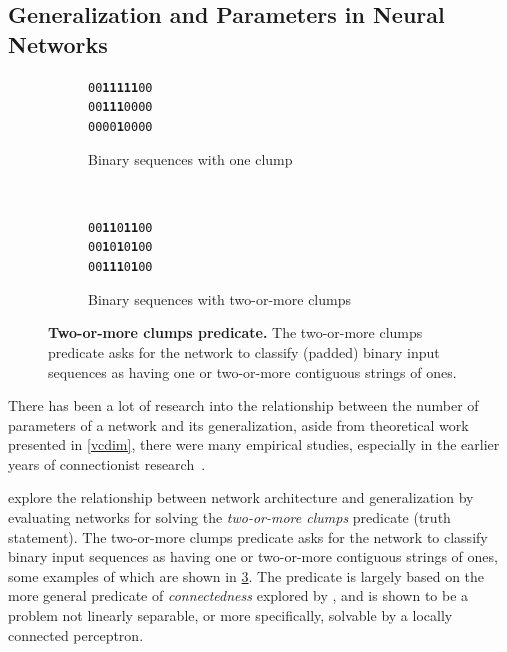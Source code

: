 \documentclass[thesis]{subfiles}
\begin{document}
	\subsection{Generalization and Parameters in Neural Networks}
	\begin{figure}[tb]
		\centering
		\large
        \renewcommand{\ttdefault}{pcr}
		\begin{subfigure}[t]{0.45\textwidth}
			\begin{center}
			\texttt{00\textbf{11111}00}\\
			\texttt{00\textbf{111}0000}\\
			\texttt{0000\textbf{1}0000}
			\end{center}
			\caption{Binary sequences with one clump}
			\label{fig:oneclump}
		\end{subfigure}
		~
		\begin{subfigure}[t]{0.45\textwidth}
			\begin{center}
			\texttt{00\textbf{11}0\textbf{11}00}\\
			\texttt{00\textbf{1}0\textbf{1}0\textbf{1}00}\\
			\texttt{00\textbf{111}0\textbf{1}00}
			\end{center}
			\caption{Binary sequences with two-or-more clumps}
			\label{fig:twoclumps}
		\end{subfigure}
		
		\caption[Two-or-more clumps predicate]{\textbf{Two-or-more clumps predicate.} The two-or-more clumps predicate asks for the network to classify (padded) binary input sequences as having one or two-or-more contiguous strings of ones.}\label{fig:tomclumps}
	\end{figure}
	There has been a lot of research into the relationship between the number of parameters of a network and its generalization, aside from theoretical work presented in \cref{vcdim}, there were many empirical studies, especially in the earlier years of connectionist research~\citep{denker1987large, giles1987learning, hinton1987learning, lecun1989generalization, ahmad1989scaling,hanson1989comparing}.

	\citet{denker1987large,giles1987learning} explore the relationship between network architecture and generalization by evaluating networks for solving the \emph{two-or-more clumps} predicate (truth statement). The two-or-more clumps predicate asks for the network to classify binary input sequences as having one or two-or-more contiguous strings of ones, some examples of which are shown in \cref{fig:tomclumps}. The predicate is largely based on the more general predicate of \emph{connectedness} explored by \citet{minsky1988perceptrons}, and is shown to be a problem not linearly separable, or more specifically, solvable by a locally connected perceptron. 
	
\end{document}
